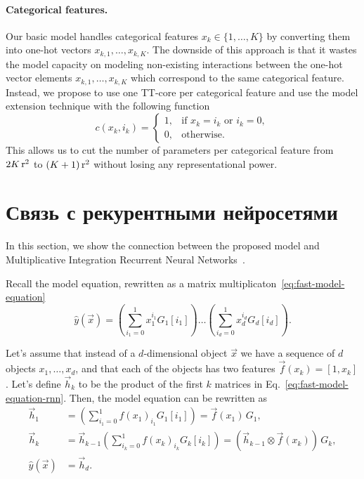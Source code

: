 \paragraph{Categorical features.} Our basic model handles categorical features $x_k \in \{1, \ldots, K\}$ by converting them into one-hot vectors $x_{k,1}, \ldots, x_{k,K}$. The downside of this approach is that it wastes the model capacity on modeling non-existing interactions between the one-hot vector elements $x_{k,1}, \ldots, x_{k,K}$ which correspond to the same categorical feature. Instead, we propose to use one TT-core per categorical feature and use the model extension technique with the following function
\begin{equation*}
c(x_k, i_k) =
\begin{cases}
1, & \text{if } x_k = i_k \text{ or } i_k = 0,\\
0, & \text{otherwise.}
\end{cases}
\end{equation*}
This allows us to cut the number of parameters per categorical feature from $2K\operatorname{r}^2$ to $(K + 1)\operatorname{r}^2$ without losing any representational power.

\section{Связь с рекурентными нейросетями}
In this section, we show the connection between the proposed model and Multiplicative Integration Recurrent Neural Networks~\cite{wu2016multiplicative}.

Recall the model equation, rewritten as a matrix multiplicaton~\eqref{eq:fast-model-equation}
\begin{equation}
\label{eq:fast-model-equation-rnn}
\widehat{y}(\vec{x}) = \left ( \sum_{i_1=0}^1 x_1^{i_1} G_1[i_1] \right ) \ldots \left ( \sum_{i_d=0}^1 x_d^{i_d} G_d[i_d] \right ).
\end{equation}

 Let's assume that instead of a $d$-dimensional object $\vec{x}$ we have a sequence of $d$ objects $x_1, \ldots, x_d$, and that each of the objects has two features $\vec{f}(x_k) = [1, x_k]$. Let's define $\vec{h}_k$ to be the product of the first $k$ matrices in Eq.~\eqref{eq:fast-model-equation-rnn}. Then, the model equation can be rewritten as
 \begin{align*}
\vec{h}_1 &=  \left ( \sum_{i_1=0}^1 f(x_1)_{i_1} G_1[i_1] \right ) = \vec{f}(x_1) \, G_1,\\
\vec{h}_k &= \vec{h}_{k-1} \left ( \sum_{i_k=0}^1 f(x_k)_{i_k} G_k[i_k] \right ) = \left (\vec{h}_{k-1} \otimes \vec{f}(x_k) \right) \, G_k,\\
\widehat{y}(\vec{x}) &= \vec{h}_d.
\end{align*}


